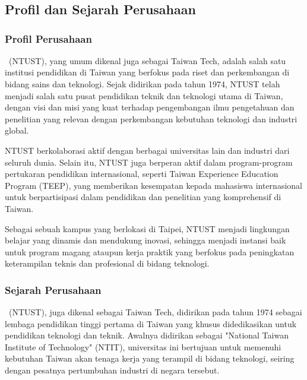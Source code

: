 \chapter{\babDua}

\section{Profil dan Sejarah Perusahaan}

\subsection{Profil Perusahaan}
\namaUniv \ (NTUST), yang umum dikenal juga sebagai Taiwan Tech, adalah salah satu institusi pendidikan di Taiwan yang berfokus pada riset dan perkembangan di bidang sains dan teknologi. Sejak didirikan pada tahun 1974, NTUST telah menjadi salah satu pusat pendidikan teknik dan teknologi utama di Taiwan, dengan visi dan misi yang kuat terhadap pengembangan ilmu pengetahuan dan penelitian yang relevan dengan perkembangan kebutuhan teknologi dan industri global.

NTUST berkolaborasi aktif dengan berbagai universitas lain dan industri dari seluruh dunia. Selain itu, NTUST juga berperan aktif dalam program-program pertukaran pendidikan internasional, seperti Taiwan Experience Education Program (TEEP), yang memberikan kesempatan kepada mahasiswa internasional untuk berpartisipasi dalam pendidikan dan penelitian yang komprehensif di Taiwan.

Sebagai sebuah kampus yang berlokasi di Taipei, NTUST menjadi lingkungan belajar yang dinamis dan mendukung inovasi, sehingga menjadi instansi baik untuk program magang ataupun kerja praktik yang berfokus pada peningkatan keterampilan teknis dan profesional di bidang teknologi.

\subsection{Sejarah Perusahaan}
\namaUniv \ (NTUST), juga dikenal sebagai Taiwan Tech, didirikan pada tahun 1974 sebagai lembaga pendidikan tinggi pertama di Taiwan yang khusus didedikasikan untuk pendidikan teknologi dan teknik. Awalnya didirikan sebagai "National Taiwan Institute of Technology" (NTIT), universitas ini bertujuan untuk memenuhi kebutuhan Taiwan akan tenaga kerja yang terampil di bidang teknologi, seiring dengan pesatnya pertumbuhan industri di negara tersebut.

